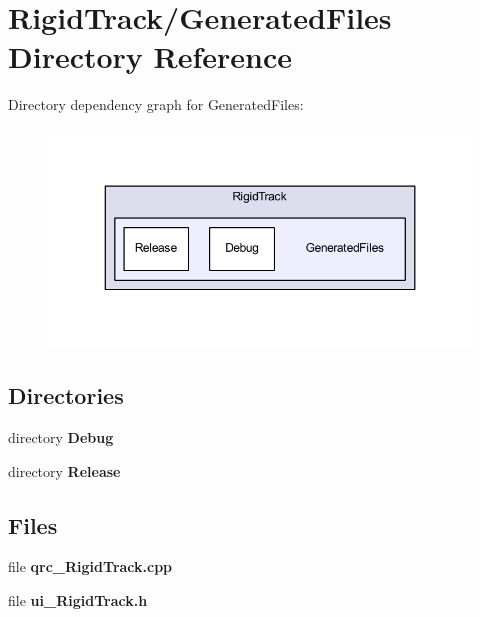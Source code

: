 \section{Rigid\+Track/\+Generated\+Files Directory Reference}
\label{dir_b7e055301d3b88b9254bfa3e1011fa29}
Directory dependency graph for Generated\+Files\+:\nopagebreak
\begin{figure}[H]
\begin{center}
\leavevmode
\includegraphics[width=350pt]{dir_b7e055301d3b88b9254bfa3e1011fa29_dep}
\end{center}
\end{figure}
\subsection*{Directories}
\begin{DoxyCompactItemize}
\item 
directory \textbf{ Debug}
\item 
directory \textbf{ Release}
\end{DoxyCompactItemize}
\subsection*{Files}
\begin{DoxyCompactItemize}
\item 
file \textbf{ qrc\+\_\+\+Rigid\+Track.\+cpp}
\item 
file \textbf{ ui\+\_\+\+Rigid\+Track.\+h}
\end{DoxyCompactItemize}
